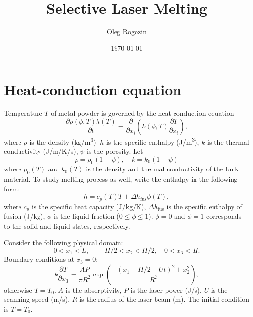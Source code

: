 \documentclass{article}
\title{Selective Laser Melting}
\date{\today}
\author{Oleg Rogozin}
\newcommand{\pder}[2][]{\frac{\partial#1}{\partial#2}}
\newcommand{\idx}[2][]{#1_{\mathrm{#2}}}
\begin{document}
\maketitle

\section{Heat-conduction equation}

Temperature \(T\) of metal powder is governed by the heat-conduction equation
\begin{equation}\label{eq:heat_conduction}
	\pder[\rho(\phi,T) h(T)]{t} = \pder{x_i}\left(k(\phi,T)\pder[T]{x_i}\right),
\end{equation}
where \(\rho\) is the density (\si{kg/m^3}), \(h\) is the specific enthalpy (\si{J/m^3}),
\(k\) is the thermal conductivity (\si{J/m/K/s}), \(\psi\) is the porosity.
Let
\begin{equation}\label{eq:porosity}
	\rho = \rho_0(1-\psi), \quad k = k_0(1-\psi)
\end{equation}
where \(\rho_0(T)\) and \(k_0(T)\) is the density and thermal conductivity
of the bulk material.
To study melting process as well, write the  enthalpy in the following form:
\begin{equation}\label{eq:enthalpy}
	h = c_p(T)T + \Delta\idx[h]{fus}\phi(T),
\end{equation}
where \(c_p\) is the specific heat capacity (\si{J/kg/K}),
\(\Delta\idx[h]{fus}\) is the specific enthalpy of fusion (\si{J/kg}),
\(\phi\) is the liquid fraction (\(0 \leq \phi \leq 1\)).
\(\phi=0\) and \(\phi=1\) corresponds to the solid and liquid states, respectively.

Consider the following physical domain:
\begin{equation}
	0 < x_1 < L, \quad -H/2 < x_2 < H/2, \quad 0 < x_3 < H.
\end{equation}
Boundary conditions at \(x_3=0\):
\begin{equation}\label{eq:bc}
	k\pder[T]{x_3} = \frac{AP}{\pi R^2}\exp\left(-\frac{(x_1-H/2-Ut)^2 + x_2^2}{R^2}\right),
\end{equation}
otherwise \(T = T_0\).
\(A\) is the absorptivity, \(P\) is the laser power (\si{J/s}), \(U\) is the scanning speed (\si{m/s}),
\(R\) is the radius of the laser beam (\si{m}).
The initial condition is \(T=T_0\).
\end{document}
